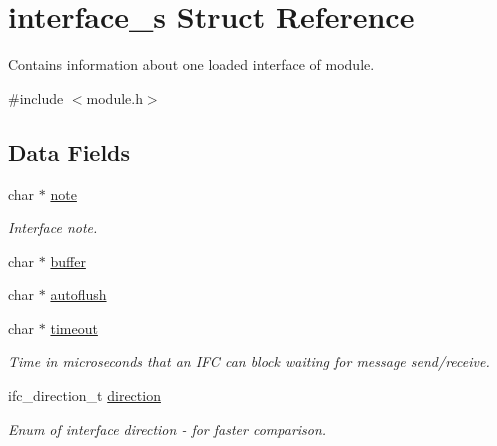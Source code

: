 \hypertarget{structinterface__s}{}\section{interface\+\_\+s Struct Reference}
\label{structinterface__s}


Contains information about one loaded interface of module.  




{\ttfamily \#include $<$module.\+h$>$}

\subsection*{Data Fields}
\begin{DoxyCompactItemize}
\item 
\mbox{\label{structinterface__s_a96464a503c63613eaf00a8a6e654e904}} 
char $\ast$ \hyperlink{structinterface__s_a96464a503c63613eaf00a8a6e654e904}{note}
\begin{DoxyCompactList}\small\item\em Interface note. \end{DoxyCompactList}\item 
char $\ast$ \hyperlink{structinterface__s_aac385a8eeeaf8566d36048a5a3fb6744}{buffer}
\item 
char $\ast$ \hyperlink{structinterface__s_a376ab6a176e70c12a7f4ccc5a6b22f01}{autoflush}
\item 
\mbox{\label{structinterface__s_a146bea7e3198dbb419f7568ae07d8537}} 
char $\ast$ \hyperlink{structinterface__s_a146bea7e3198dbb419f7568ae07d8537}{timeout}
\begin{DoxyCompactList}\small\item\em Time in microseconds that an I\+FC can block waiting for message send/receive. \end{DoxyCompactList}\item 
\mbox{\label{structinterface__s_a828eaa421a79ba6535bfe2c3de9242c6}} 
ifc\+\_\+direction\+\_\+t \hyperlink{structinterface__s_a828eaa421a79ba6535bfe2c3de9242c6}{direction}
\begin{DoxyCompactList}\small\item\em Enum of interface direction -\/ for faster comparison. \end{DoxyCompactList}\item 

\end{DoxyCompactItemize}

